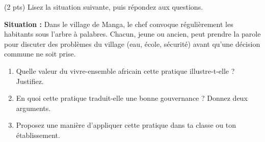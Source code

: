\documentclass[11pt]{article}
\begin{document}
\begin{exercice} (2 pts)
Lisez la situation suivante, puis répondez aux questions.

\textbf{Situation :} Dans le village de Manga, le chef convoque régulièrement les habitants sous l'arbre à palabres. Chacun, jeune ou ancien, peut prendre la parole pour discuter des problèmes du village (eau, école, sécurité) avant qu'une décision commune ne soit prise.

\begin{enumerate}
\item Quelle valeur du vivre-ensemble africain cette pratique illustre-t-elle ? Justifiez.
\item En quoi cette pratique traduit-elle une bonne gouvernance ? Donnez deux arguments.
\item Proposez une manière d'appliquer cette pratique dans ta classe ou ton établissement.
\end{enumerate}
\end{exercice}
\end{document}
